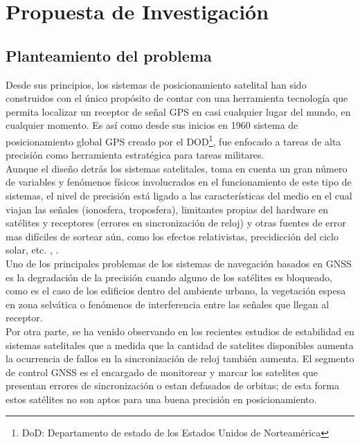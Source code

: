 \chapter{Propuesta de Investigación}
\label{sec:propuesta}

\section{Planteamiento del problema}

Desde sus principios, los sistemas de posicionamiento satelital han sido construidos con el único propósito de contar con una herramienta tecnología que permita localizar un receptor de señal GPS en casi cualquier lugar del mundo, en cualquier momento. Es así como desde sus inicios en 1960 sistema de posicionamiento global GPS creado por el DOD\footnote{DoD: Departamento de estado de los Estados Unidos de Norteamérica}, fue enfocado a tareas de alta precisión como herramienta estratégica para tareas militares.\\

Aunque el diseño detrás los sistemas satelitales, toma en cuenta un gran número de variables y fenómenos físicos involucrados en el funcionamiento de este tipo de sistemas, el nivel de precisión está ligado a las características del medio en el cual viajan las señales (ionosfera, troposfera)\cite{Hofmann_Wellenhof_1992}, limitantes propias del hardware en satélites y receptores (errores en sincronización de reloj) y otras fuentes de error mas difíciles de sortear aún, como los efectos relativistas, precidicción del ciclo solar, etc. \cite{de2007analise}, \cite{Novatel:2015:Online}.\\%

Uno de los principales problemas de los sistemas de navegación basados en GNSS es la degradación de la precisión cuando alguno de los satélites es bloqueado, como es el caso de los edificios dentro del ambiente urbano, la vegetación espesa en zona selvática o fenómenos de interferencia entre las señales que llegan al receptor.\\

Por otra parte, se ha venido observando en los recientes estudios de estabilidad en sistemas satelitales que a medida que la cantidad de satelites disponibles aumenta la ocurrencia de fallos en la sincronización de reloj también aumenta. El segmento de control GNSS es el encargado de monitorear y marcar los satelites que presentan errores de sincronización o estan defasados de orbitas; de esta forma estos satélites no son aptos para una buena precisión en posicionamiento.\\

